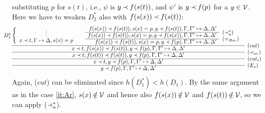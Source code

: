 \begin{PROOF}
\begin{LS}
\begin{LSA}
\begin{LSB}
\begin{LSC}
\begin{LSD}
substituting $p$ for $s(t)$, i.e., $\psi$ is $y\mathbin{\prec} f(s(t))$, and $\psi'$ is
 $y\mathbin{\prec} f(p)$ for a $y\in{\cal V}$. Here we have to weaken $D_2^*$ also with 
$f(s(x))\mathbin{\prec} f(s(t))$:
{\footnotesize
\[ \begin{array}{cl} \hspace*{-2em}
D_1^* \left \{ \begin{array}{c} \vdots \\ 
 x\Incl t, \GSD, s(x)=p \end{array} \right . \ \ \ \ 
\begin{array}{rl}
f(s(x))\Incl f(s(t)), s(x)=p, y\Incl f(s(t)), \Gamma, \Gamma' \Seq \Delta, \Delta' \\
 \cline{1-1}
f(s(x))\Incl f(s(t)), s(x)=p, y\Incl f(s(x)), \Gamma, \Gamma' \Seq \Delta, \Delta' 
 &   \raisebox{1.2ex}[1.5ex][0ex]{($\Incl_a^*$)} \\ \cline{1-1}
f(s(x))\Incl f(s(t)), s(x)=p, y\Incl f(p), \Gamma, \Gamma' \Seq \Delta, \Delta' 
 &   \raisebox{1.2ex}[1.5ex][0ex]{($=_{Rar}$)} 
 \end{array} \\ \cline{1-1}
x\Incl t, f(s(x))\Incl f(s(t)), y\Incl f(p), \Gamma, \Gamma' \Seq \Delta, \Delta' 
 &   \raisebox{1.2ex}[1.5ex][0ex]{($cut$)} \\ \cline{1-1}
x\Incl t, f(s(t))\Incl f(s(t)), y\Incl f(p), \Gamma, \Gamma' \Seq \Delta, \Delta' 
 &   \raisebox{1.2ex}[1.5ex][0ex]{($\Incl_{ar}$)} \\ \cline{1-1}
x\Incl t, y\Incl f(p), \Gamma, \Gamma' \Seq \Delta, \Delta' 
 &   \raisebox{1.2ex}[1.5ex][0ex]{($cut_t$)} \\ \cline{1-1}
y\Incl f(p), \Gamma, \Gamma' \Seq \Delta, \Delta' 
 &   \raisebox{1.2ex}[1.5ex][0ex]{($E_s$)}
\end{array} \]
}
Again, ($cut$) can be eliminated since $h(D_1^*)<h(D_1)$.
By the same argument as in the case \ref{it:Ar}, $s(x)\not\in\Vars$ and
hence also $f(s(x))\not\in\Vars$ and $f(s(t))\not\in\Vars$, 
so we can apply ($\mathbin{\prec}_a^*$).
\end{LSD}
\end{LSC}
\end{LSB}
\end{LSA}
\end{LS}
\end{PROOF}
